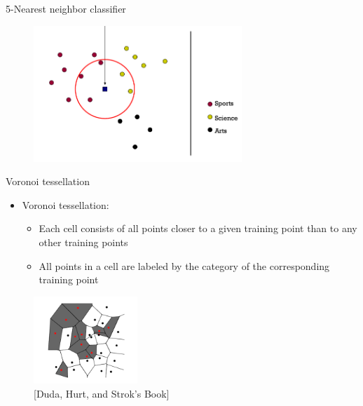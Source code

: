 \documentclass[serif, aspectratio=169]{beamer}
\begin{document}
\begin{frame}{5-Nearest neighbor classifier}
    \begin{figure}[h]
            \centering
            
            \includegraphics[width=0.7\textwidth]{pic/5NN.png}
            \end{figure}
    \vfill
\end{frame}
\begin{frame}{Voronoi tessellation}

    \begin{itemize}
        \item Voronoi tessellation:
         \begin{itemize}
             \item Each cell consists of all points closer to a given training point than to any other training points
             \item All points in a cell are labeled by the category of the corresponding training point
         \end{itemize}
         
         
    \end{itemize}
    \begin{figure}[h]
            \centering
            
            \includegraphics[width=0.35\textwidth]{pic/Voroni.png}
            \caption* { \scriptsize [Duda, Hurt, and Strok’s Book]}
            \end{figure}
\end{frame}
\end{document}
